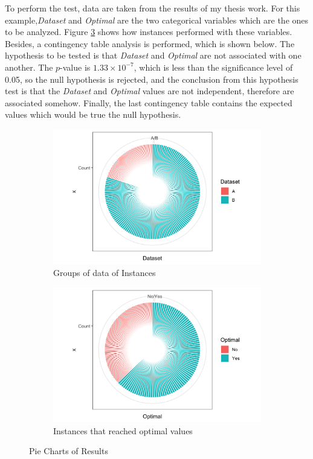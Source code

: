 \documentclass[10pt,leter,openany]{article}
\begin{document}
To perform the test, data are taken from the results of my thesis work. For this example,\textit{Dataset} and \textit{Optimal} are the two categorical variables which are the ones to be analyzed. Figure \ref{fig:pies} shows how instances performed with these variables. Besides, a contingency table analysis is performed, which is shown below. The hypothesis to be tested is that \textit{Dataset} and \textit{Optimal} are not associated with one another. The $p$-value is $1.33 \times 10^{-7}$, which is less than the significance level of 0.05, so the null hypothesis is rejected, and the conclusion from this hypothesis test is that the \textit{Dataset} and \textit{Optimal} values are not independent, therefore are associated somehow. Finally, the last contingency table contains the expected values which would be true the null hypothesis.
		 \begin{figure}
			\centering
			\begin{subfigure}[b]{0.475\textwidth}
				\centering
				\includegraphics[width=\textwidth]{extras/pie_dataset}
				\caption[]%
				{{\small Groups of data of Instances}}    
				\label{fig:pie_dataset}
			\end{subfigure}
			\hfill
			\begin{subfigure}[b]{0.475\textwidth}  
				\centering 
				\includegraphics[width=\textwidth]{extras/pie_optimal}
				\caption[]%
				{{\small Instances that reached optimal values}}    
				\label{fig:pie:optimal}
			\end{subfigure}
			\hfill
			\caption[ ]
			{\small Pie Charts of Results} 
			\label{fig:pies}
		\end{figure}
	
\end{document}
